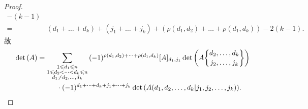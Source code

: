 \documentclass[../libro.tex]{subfiles}
\begin{document}
\begin{proof}
\begin{align*}
        - (k - 1)
        \\
        = {} &
        (d_1 + \dots + d_k) + (j_1 + \dots + j_k)
        + (\rho(d_1, d_2) + \dots + \rho(d_1, d_k))
        - 2(k-1).
    \end{align*}
    故
    \begin{align*}
        &
        \det {(A)}
        = \sum_{\substack{
                1 \leq d_1 \leq n               \\
                1 \leq d_2 < \dots < d_k \leq n \\
                d_1 \neq d_2,\dots,d_k
        }}
        {(-1)^{\rho(d_1, d_2) + \dots + \rho(d_1, d_k)}
            [A]_{d_1,j_1}
            \det {\left(
                    A\submat{d_2, \dots, d_k}{j_2, \dots, j_k}
        \right)}}
        \\
        &
        \qquad \qquad \qquad
        \cdot (-1)^{d_1 + \dots + d_k + j_1 + \dots + j_k}
        \det {(A({d_1,d_2,\dots,d_k}|{j_1,j_2,\dots,j_k}))}.
    \end{align*}




\end{proof}
\end{document}
